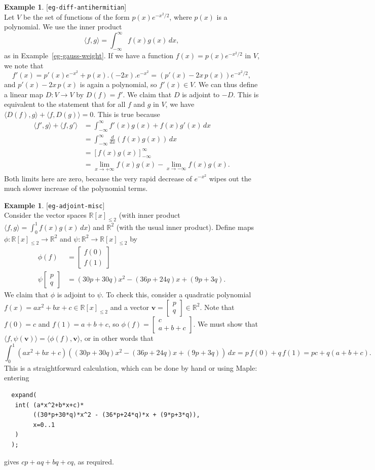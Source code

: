 \documentclass{amsart}
\newcommand{\lbl}[1]{\label{#1}\textup{[\texttt{#1}]}\ \\}
\newcommand{\lbl}{\label}
\newcommand{\R}         {{\mathbb{R}}}
\newcommand{\bsm}       {\left[\begin{smallmatrix}}
\newcommand{\esm}       {\end{smallmatrix}\right]}
\newcommand{\ip}[1]     {\langle #1\rangle}
\newcommand{\vv}        {\mathbf{v}}
\renewcommand{\:}       {\colon}
\theoremstyle{definition}
\newtheorem{example}[theorem]{Example}
\begin{document}
\begin{example}\lbl{eg-diff-antihermitian}
 Let $V$ be the set of functions of the form
 $p(x)e^{-x^2/2}$, where $p(x)$ is a polynomial.  We use the
 inner product 
 \[ \ip{f,g} = \int_{-\infty}^\infty f(x)g(x)\,dx, \]
 as in Example~\ref{eg-gauss-weight}.  If we have a function
 $f(x)=p(x)e^{-x^2/2}$ in $V$, we note that 
 \[ f'(x) = p'(x)e^{-x^2} + p(x).(-2x).e^{-x^2}
          = (p'(x)-2x\,p(x))e^{-x^2/2},
 \]
 and $p'(x)-2x\,p(x)$ is again a polynomial, so $f'(x)\in V$.
 We can thus define a linear map $D\:V\to V$ by $D(f)=f'$.
 We claim that $D$ is adjoint to $-D$.  This is equivalent
 to the statement that for all $f$ and $g$ in $V$, we have
 $\ip{D(f),g}+\ip{f,D(g)}=0$.  This is true because
 \begin{align*}
  \ip{f',g} + \ip{f,g'}
   &= \int_{-\infty}^\infty f'(x)g(x) + f(x)g'(x)\,dx \\
   &= \int_{-\infty}^\infty \frac{d}{dx}(f(x)g(x))\,dx \\
   &= \left[ f(x)g(x) \right]_{-\infty}^\infty \\
   &= \lim_{x\to +\infty} f(x)g(x) - 
      \lim_{x\to -\infty} f(x)g(x).
 \end{align*}
 Both limits here are zero, because the very rapid decrease
 of $e^{-x^2}$ wipes out the much slower increase of the
 polynomial terms.
\end{example}
\begin{example}\lbl{eg-adjoint-misc}
 Consider the vector spaces $\R[x]_{\leq 2}$ (with inner
 product $\ip{f,g}=\int_0^1 f(x)g(x)\,dx$) and $\R^2$ (with
 the usual inner product).  Define maps
 $\phi\:\R[x]_{\leq 2}\to\R^2$ and
 $\psi\:\R^2\to\R[x]_{\leq 2}$ by
 \begin{align*}
  \phi(f) &= \bsm f(0) \\ f(1) \esm \\
  \psi\bsm p\\ q\esm &= 
   (30p+30q)x^2 - (36p+24q)x + (9p+3q).
 \end{align*}
 We claim that $\phi$ is adjoint to $\psi$.  To check this,
 consider a quadratic polynomial
 $f(x)=ax^2+bx+c\in\R[x]_{\leq 2}$ and a
 vector $\vv=\bsm p\\ q\esm\in\R^2$.  Note that $f(0)=c$ and
 $f(1)=a+b+c$, so $\phi(f)=\bsm c\\ a+b+c\esm$.  We must
 show that $\ip{f,\psi(\vv)}=\ip{\phi(f),\vv}$, or in other
 words that
 \[ \int_0^1 (ax^2+bx+c)
     ((30p+30q)x^2 - (36p+24q)x + (9p+3q))\,dx = 
      p\,f(0)+q\,f(1) = 
      pc + q(a+b+c).
 \]
 This is a straightforward calculation, which can be done by
 hand or using Maple: entering
 \begin{verbatim}
  expand(
   int( (a*x^2+b*x+c)*
        ((30*p+30*q)*x^2 - (36*p+24*q)*x + (9*p+3*q)),
        x=0..1
   )
  );
 \end{verbatim}
 gives $cp+aq+bq+cq$, as required.
\end{example}
\end{document}
